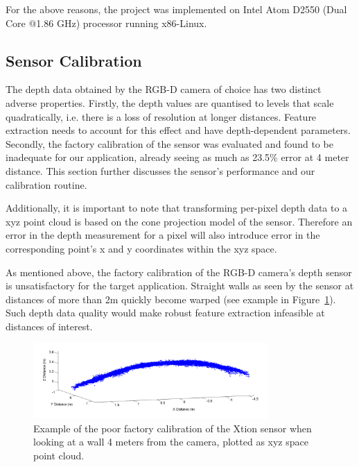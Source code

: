 \documentclass[]{article}
\begin{document}
{For the above reasons, the project was implemented on Intel Atom D2550 (Dual Core @1.86 GHz) processor running x86-Linux. 



\subsection{Sensor Calibration} %

The depth data obtained by the RGB-D camera of choice has two distinct adverse properties. Firstly, the depth values are quantised to levels that scale quadratically, i.e. there is a loss of resolution at longer distances. Feature extraction needs to account for this effect and have depth-dependent parameters. Secondly, the factory calibration of the sensor was evaluated and found to be inadequate for our application, already seeing as much as 23.5\% error at 4 meter distance. This section further discusses the sensor's performance and our calibration routine.

Additionally, it is important to note that transforming per-pixel depth data to a xyz point cloud is based on the cone projection model of the sensor. Therefore an error in the depth measurement for a pixel will also introduce error in the corresponding point's x and y coordinates within the xyz space.

As mentioned above, the factory calibration of the RGB-D camera's depth sensor is unsatisfactory for the target application. Straight walls as seen by the sensor at distances of more than 2m quickly become warped (see example in Figure~\ref{fig:uncal5m2}). Such depth data quality would make robust feature extraction infeasible at distances of interest.


\begin{figure}[htb]
\centering     %
\includegraphics[width=0.8\textwidth]{uncal5m2.PNG}
\caption{Example of the poor factory calibration of the Xtion sensor when looking at a wall 4 meters from the camera, plotted as xyz space point cloud.}
\label{fig:uncal5m2}
\end{figure}

}
\end{document}
